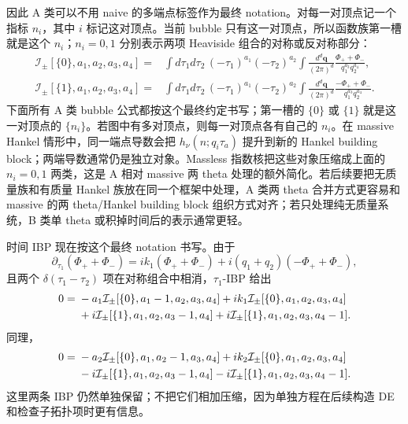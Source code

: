 ﻿\documentclass[a4paper,11pt]{article}
\begin{document}
因此 A 类可以不用 naive 的多端点标签作为最终 notation。对每一对顶点记一个指标 $n_i$，其中 $i$ 标记这对顶点。当前 bubble 只有这一对顶点，所以函数族第一槽就是这个 $n_i$；$n_i=0,1$ 分别表示两项 Heaviside 组合的对称或反对称部分：
\begin{equation}
    \begin{aligned}
    \mathcal{I}_{\pm}[\{0\},a_1,a_2,a_3,a_4]
    =
    &\int d\tau_1d\tau_2\,(-\tau_1)^{a_1}(-\tau_2)^{a_2}
    \int\frac{d^d\boldsymbol{q}}{(2\pi)^d}
    \frac{\Phi_++\Phi_-}{q_1^{a_3}q_2^{a_4}},\\
    \mathcal{I}_{\pm}[\{1\},a_1,a_2,a_3,a_4]
    =
    &\int d\tau_1d\tau_2\,(-\tau_1)^{a_1}(-\tau_2)^{a_2}
    \int\frac{d^d\boldsymbol{q}}{(2\pi)^d}
    \frac{-\Phi_++\Phi_-}{q_1^{a_3}q_2^{a_4}}.
    \end{aligned}
\end{equation}
下面所有 A 类 bubble 公式都按这个最终约定书写；第一槽的 $\{0\}$ 或 $\{1\}$ 就是这一对顶点的 $\{n_i\}$。若图中有多对顶点，则每一对顶点各有自己的 $n_i$。在 massive Hankel 情形中，同一端点导数会把 $h_{\nu}(n;q_i\tau_a)$ 提升到新的 Hankel building block；两端导数通常仍是独立对象。Massless 指数核把这些对象压缩成上面的 $n_i=0,1$ 两类，这是 A 相对 massive 两 theta 处理的额外简化。若后续要把无质量族和有质量 Hankel 族放在同一个框架中处理，A 类两 theta 合并方式更容易和 massive 的两 theta/Hankel building block 组织方式对齐；若只处理纯无质量系统，B 类单 theta 或积掉时间后的表示通常更轻。

时间 IBP 现在按这个最终 notation 书写。由于
\begin{equation}
    \partial_{\tau_1}(\Phi_++\Phi_-)
    =
    ik_1(\Phi_++\Phi_-)+i(q_1+q_2)(-\Phi_++\Phi_-),
\end{equation}
且两个 $\delta(\tau_1-\tau_2)$ 项在对称组合中相消，$\tau_1$-IBP 给出
\begin{align}
    0={}&-a_1\mathcal{I}_{\pm}[\{0\},a_1-1,a_2,a_3,a_4]
    +ik_1\mathcal{I}_{\pm}[\{0\},a_1,a_2,a_3,a_4]\notag\\
    &+i\mathcal{I}_{\pm}[\{1\},a_1,a_2,a_3-1,a_4]
    +i\mathcal{I}_{\pm}[\{1\},a_1,a_2,a_3,a_4-1].
    \label{tau1IBPnew}
\end{align}
同理，
\begin{align}
    0={}&-a_2\mathcal{I}_{\pm}[\{0\},a_1,a_2-1,a_3,a_4]
    +ik_2\mathcal{I}_{\pm}[\{0\},a_1,a_2,a_3,a_4]\notag\\
    &-i\mathcal{I}_{\pm}[\{1\},a_1,a_2,a_3-1,a_4]
    -i\mathcal{I}_{\pm}[\{1\},a_1,a_2,a_3,a_4-1].
    \label{tau2IBPnew}
\end{align}
这里两条 IBP 仍然单独保留；不把它们相加压缩，因为单独方程在后续构造 DE 和检查子拓扑项时更有信息。
\end{document}
